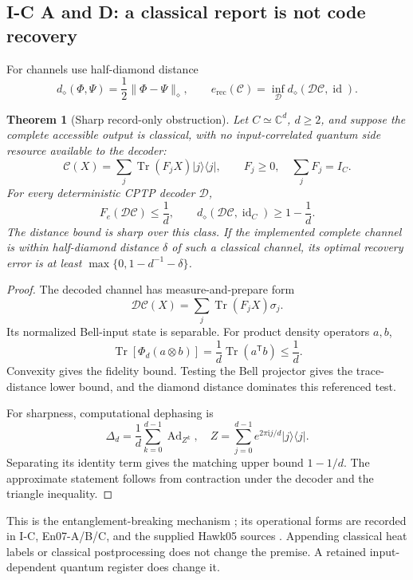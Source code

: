 \documentclass[11pt,a4paper]{article}
\newcommand{\CC}{\mathbb C}
\newcommand{\ii}{\mathrm i}
\newcommand{\id}{\operatorname{id}}
\newcommand{\Tr}{\operatorname{Tr}}
\newcommand{\norm}[1]{\lVert#1\rVert}
\newcommand{\proj}[1]{\lvert#1\rangle\langle#1\rvert}
\theoremstyle{plain}
\newtheorem{theorem}{Theorem}[section]
\theoremstyle{definition}
\theoremstyle{remark}
\numberwithin{equation}{section}
\begin{document}
\subsection{I-C A and D: a classical report is not code recovery}

For channels use half-diamond distance
\[
 d_\diamond(\Phi,\Psi)=\frac12\norm{\Phi-\Psi}_\diamond,
 \qquad
 e_{\mathrm{rec}}(\mathcal C)
 =\inf_{\mathcal D}d_\diamond(\mathcal D\mathcal C,\id).
\]

\begin{theorem}[Sharp record-only obstruction]
\label{thm:classical}
Let \(C\simeq\CC^d\), \(d\ge2\), and suppose the complete accessible
output is classical, with no input-correlated quantum side
resource available to the decoder:
\[
 \mathcal C(X)=\sum_j\Tr(F_jX)\proj j,\qquad
 F_j\ge0,\quad\sum_jF_j=I_C.
\]
For every deterministic CPTP decoder \(\mathcal D\),
\begin{equation}
 F_e(\mathcal D\mathcal C)\le\frac1d,\qquad
 d_\diamond(\mathcal D\mathcal C,\id_C)\ge1-\frac1d.
 \label{eq:classical}
\end{equation}
The distance bound is sharp over this class.
If the implemented complete channel is within half-diamond
distance \(\delta\) of such a classical channel, its optimal
recovery error is at least
\(\max\{0,1-d^{-1}-\delta\}\).
\end{theorem}

\begin{proof}
The decoded channel has measure-and-prepare form
\[
 \mathcal D\mathcal C(X)=\sum_j\Tr(F_jX)\sigma_j.
\]
Its normalized Bell-input state is separable.
For product density operators \(a,b\),
\[
 \Tr[\Phi_d(a\otimes b)]
 =\frac1d\Tr(a^{\mathsf T}b)\le\frac1d.
\]
Convexity gives the fidelity bound.
Testing the Bell projector gives the trace-distance lower bound,
and the diamond distance dominates this referenced test.

For sharpness, computational dephasing is
\[
 \Delta_d=\frac1d\sum_{k=0}^{d-1}\operatorname{Ad}_{Z^k},
 \quad Z=\sum_{j=0}^{d-1}e^{2\pi\ii j/d}\proj j.
\]
Separating its identity term gives the matching upper bound
\(1-1/d\). The approximate statement follows from contraction
under the decoder and the triangle inequality.
\end{proof}

This is the entanglement-breaking mechanism
\cite{HSR}; its operational forms are recorded in I-C,
En07-A/B/C, and the supplied Hawk05 sources
\cite{CheungIC,CheungEn07,CheungHawk05}.
Appending classical heat labels or classical postprocessing
does not change the premise.
A retained input-dependent quantum register does change it.
\end{document}

